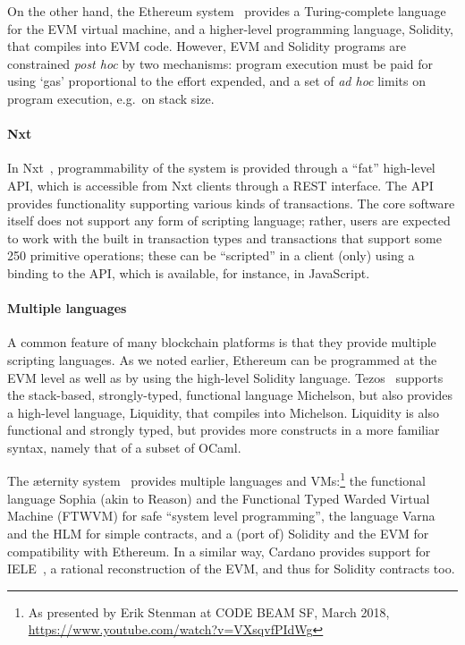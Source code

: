 \documentclass[runningheads]{llncs}
\begin{document}
On the other hand, the Ethereum system~\cite{wood2014ethereum} provides a Turing-complete language for the EVM virtual 
machine, and a higher-level programming language, Solidity, that compiles into EVM code. However, EVM and Solidity 
programs are constrained \emph{post hoc} by two mechanisms: program execution must be paid for using `gas' proportional 
to the effort expended, and a set of \emph{ad hoc} limits on program execution, e.g.\ on stack size.

\paragraph{Nxt}

In Nxt~\cite{Nxt}, programmability of the system is provided through a ``fat'' high-level 
API, which is accessible from Nxt clients through a REST interface. The API provides functionality supporting various 
kinds of transactions. The core software itself does not support any form of scripting language; rather, users are 
expected to work with the built in transaction types and transactions that support some 250 primitive operations; these 
can be ``scripted'' in a client (only) using a binding to the API, which is available, for instance, in JavaScript.

\paragraph{Multiple languages}

A common feature of many blockchain platforms is that they provide multiple scripting languages. As we noted earlier, 
Ethereum can be programmed at the EVM level as well as by using the high-level Solidity language. 
Tezos~\cite{tezos-white-paper} supports the stack-based, strongly-typed, functional language Michelson, but also 
provides a high-level language, Liquidity, that compiles into Michelson. Liquidity is also functional and strongly 
typed, but provides more constructs in a more familiar syntax, namely that of a subset of OCaml. 

The \ae{}ternity system~\cite{aeternity} provides multiple languages and VMs:\footnote{As presented by Erik Stenman at 
CODE BEAM SF, March 2018, \url{https://www.youtube.com/watch?v=VXsqvfPIdWg}} the functional language  Sophia (akin to 
Reason) and the Functional Typed Warded Virtual Machine (FTWVM) for safe ``system level programming'', the language 
Varna and the HLM for simple contracts, and a (port of) Solidity and the EVM for compatibility with Ethereum. In a 
similar way, Cardano provides support for IELE~\cite{IELE}, a rational reconstruction of the EVM, and thus for Solidity 
contracts too. 
\end{document}
